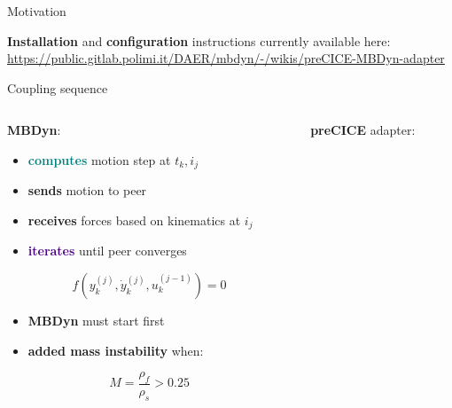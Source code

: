 \documentclass[10pt,t]{beamer}
\begin{document}
\begin{frame}{Motivation}
\begin{itemize}
        
        
    \end{itemize}
    \pause
    \vspace{3mm}
    \textbf{Installation} and \textbf{configuration} instructions currently available here:
    \vspace{2mm}
    \footnotesize
    \url{https://public.gitlab.polimi.it/DAER/mbdyn/-/wikis/preCICE-MBDyn-adapter}
    
\end{frame}



\begin{frame}{Coupling sequence}
    


\begin{columns}


\begin{column}{0.5\textwidth}
\textcolor{dorange}{\textbf{MBDyn}}:

\vspace{0.2cm}

\begin{itemize}
    \item \textcolor{teal}{\textbf{computes}} motion step at $t_k, i_j$
    \item \textcolor{fgreen}{\textbf{sends}} motion to peer
    \item \textcolor{dblue}{\textbf{receives}} forces based on kinematics at $i_j$
    \item \textcolor{indigo}{\textbf{iterates}} until peer converges
\end{itemize}

$$f\left(y_k^{(j)},\dot{y}_k^{(j)},u_k^{(j-1)}\right)=0$$

\pause

\begin{itemize}
    \item \textcolor{dorange}{\textbf{MBDyn}} must start first
    \item \textbf{added mass instability} when:
\end{itemize}

$$M = \frac{\rho_f}{\rho_s} > 0.25$$


\end{column}

\pause
\vrule{}
\begin{column}{0.5\textwidth}
\textcolor{pblue}{\textbf{preCICE}} adapter:


\end{column}
\end{columns}
\end{frame}
\end{document}

